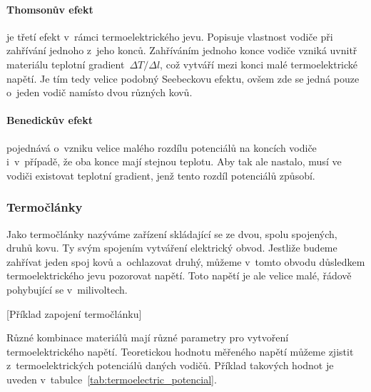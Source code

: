 \paragraph{Thomsonův efekt} je třetí efekt v~rámci termoelektrického jevu.
Popisuje vlastnost vodiče při zahřívání jednoho z~jeho konců. Zahříváním
jednoho konce vodiče vzniká uvnitř materiálu teplotní gradient~$\Delta T/\Delta l$, 
což vytváří mezi konci malé termoelektrické napětí. Je tím tedy velice
podobný Seebeckovu efektu, ovšem zde se jedná pouze o~jeden vodič namísto dvou
různých kovů.~\cite{jreichl-thomson}

\paragraph{Benedickův efekt} pojednává o~vzniku velice malého rozdílu
potenciálů na koncích vodiče i~v~případě, že oba konce mají stejnou teplotu.
Aby tak ale nastalo, musí ve vodiči existovat teplotní gradient, jenž tento
rozdíl potenciálů způsobí.~\cite{diplomka} 

\subsubsection{Termočlánky}
Jako termočlánky nazýváme zařízení skládající se ze dvou, spolu spojených,
druhů kovu. Ty svým spojením vytváření elektrický obvod. Jestliže budeme
zahřívat jeden spoj kovů a~ochlazovat druhý, můžeme v~tomto obvodu důsledkem
termoelektrického jevu pozorovat napětí. Toto napětí je ale velice malé, řádově
pohybující se v~milivoltech.

[Příklad zapojení termočlánku]

Různé kombinace materiálů mají různé parametry pro vytvoření termoelektrického 
napětí. Teoretickou hodnotu měřeného napětí můžeme zjistit z~termoelektrických
potenciálů daných vodičů. Příklad takových hodnot je uveden 
v~tabulce~\ref{tab:termoelectric_potencial}.

\newcommand{\phm}{\phantom{-}}

